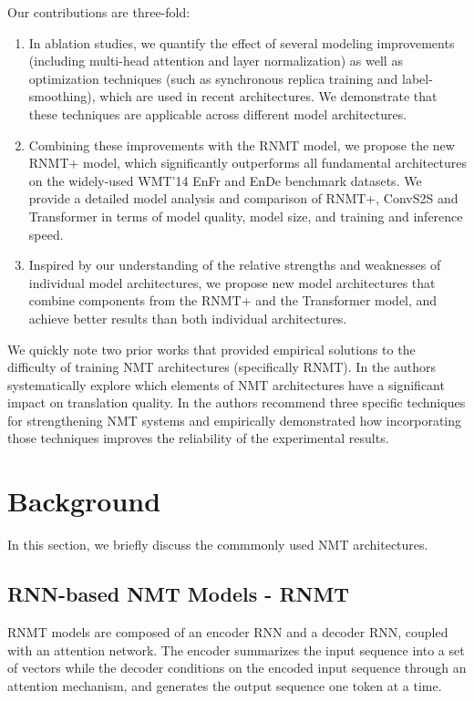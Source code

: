 \documentclass[11pt,a4paper]{article}
\begin{document}
Our contributions are three-fold:
\begin{enumerate}
\item In ablation studies, we quantify the effect of several modeling
improvements (including
multi-head attention and layer normalization) as well as
optimization techniques (such as synchronous replica training and
label-smoothing), which are used in recent architectures.
We demonstrate that these techniques are applicable
across different model architectures.

\item Combining these improvements with the RNMT model, we propose the new RNMT+
model, which significantly outperforms all fundamental architectures on
the widely-used WMT'14 EnFr
and EnDe benchmark datasets. We provide a detailed
model analysis and comparison of RNMT+, ConvS2S and Transformer
in terms of model quality, model size, and training and inference speed.

\item Inspired by our understanding of the relative strengths and weaknesses
of individual model architectures, we propose new model architectures that
combine components from the RNMT+ and the Transformer model, and achieve better
results than both individual architectures.
\end{enumerate}

We quickly note two prior works that provided empirical solutions
to the difficulty of training NMT architectures (specifically RNMT).
In \cite{britz-EtAl:2017:EMNLP2017}
the authors systematically explore which elements of NMT architectures have a
significant impact on translation quality.
In \cite{denkowski-neubig:2017:NMT}
the authors recommend three specific techniques for strengthening NMT systems
and empirically demonstrated how incorporating those techniques improves the
reliability of the experimental results.


\section{Background}
\label{sec:background}

In this section, we briefly discuss the commmonly used NMT architectures.



\subsection{RNN-based NMT Models - RNMT}
RNMT models are composed of an encoder RNN and a decoder RNN, coupled with an
attention network. The encoder summarizes the input sequence into a set of
vectors while the decoder conditions on the encoded input sequence through an
attention mechanism, and generates the output sequence one token at a time.
\end{document}
